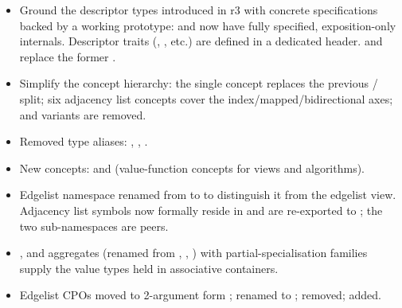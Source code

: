 \begin{itemize}
\begin{itemize}
                  \item New type aliases  and ;
                         /  retained as aliases for
                         / .
            \end{itemize}
      \item Ground the descriptor types introduced in r3 with concrete specifications backed by a working
            prototype:  and
             now have fully specified,
            exposition-only internals.  Descriptor traits (,
            , etc.) are defined in a dedicated header.
             and  replace the former
            .
      \item Simplify the concept hierarchy: the single  concept replaces the previous
            / split; six adjacency list concepts cover the
            index/mapped/bidirectional axes;  and  variants are removed.
      \item Removed type aliases: , ,
            .
      \item New concepts:  and  (value-function
            concepts for views and algorithms).
      \item Edgelist namespace renamed from  to 
            to distinguish it from the edgelist view.
            Adjacency list symbols now formally reside in  and are re-exported
            to ; the two sub-namespaces are peers.
      \item {},  and  aggregates
            (renamed from , , )
            with partial-specialisation families supply the value types held in associative
            containers.
      \item Edgelist CPOs moved to 2-argument form ;  renamed to
            ;  removed;  added.

\end{itemize}
